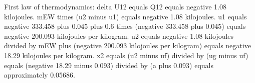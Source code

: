 First law of thermodynamics: delta U12 equals Q12 equals negative 1.08 kilojoules.  
mEW times (u2 minus u1) equals negative 1.08 kilojoules.  
u1 equals negative 333.458 plus 0.045 plus 0.6 times (negative 333.458 plus 0.045) equals negative 200.093 kilojoules per kilogram.  
u2 equals negative 1.08 kilojoules divided by mEW plus (negative 200.093 kilojoules per kilogram) equals negative 18.29 kilojoules per kilogram.  
x2 equals (u2 minus uf) divided by (ug minus uf) equals (negative 18.29 minus 0.093) divided by (a plus 0.093) equals approximately 0.05686.